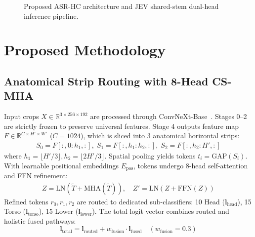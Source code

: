 \documentclass[10pt,twocolumn,letterpaper]{article}
\begin{document}
\begin{figure}[t]
{
}
\vspace{-2mm}
\caption{Proposed ASR-HC architecture and JEV shared-stem dual-head inference pipeline.}
\label{fig:architecture}
\end{figure}

\section{Proposed Methodology}
\label{sec:method}
\subsection{Anatomical Strip Routing with 8-Head CS-MHA}
Input crops $X \in \mathbb{R}^{3 \times 256 \times 192}$ are processed through ConvNeXt-Base~\cite{liu2022convnet}. Stages 0--2 are strictly frozen to preserve universal features. Stage 4 outputs feature map $F \in \mathbb{R}^{C \times H' \times W'}$ ($C=1024$), which is sliced into 3 anatomical horizontal strips:
\begin{align}
    S_0 = F[:, 0:h_1, :], \; S_1 = F[:, h_1:h_2, :], \; S_2 = F[:, h_2:H', :]
\end{align}
where $h_1 = \lfloor H'/3 \rfloor, h_2 = \lfloor 2H'/3 \rfloor$. Spatial pooling yields tokens $t_i = \mathrm{GAP}(S_i)$. With learnable positional embeddings $E_{\mathrm{pos}}$, tokens undergo 8-head self-attention and FFN refinement:
\begin{align}
    Z = \mathrm{LN}(\tilde{T} + \mathrm{MHA}(\tilde{T})), \quad Z' = \mathrm{LN}(Z + \mathrm{FFN}(Z))
\end{align}
Refined tokens $r_0, r_1, r_2$ are routed to dedicated sub-classifiers: 10 Head ($\mathbf{l}_{\mathrm{head}}$), 15 Torso ($\mathbf{l}_{\mathrm{torso}}$), 15 Lower ($\mathbf{l}_{\mathrm{lower}}$). The total logit vector combines routed and holistic fused pathways:
\begin{equation}
    \mathbf{l}_{\mathrm{total}} = \mathbf{l}_{\mathrm{routed}} + w_{\mathrm{fusion}} \cdot \mathbf{l}_{\mathrm{fused}} \quad (w_{\mathrm{fusion}} = 0.3)
\end{equation}
\end{document}
